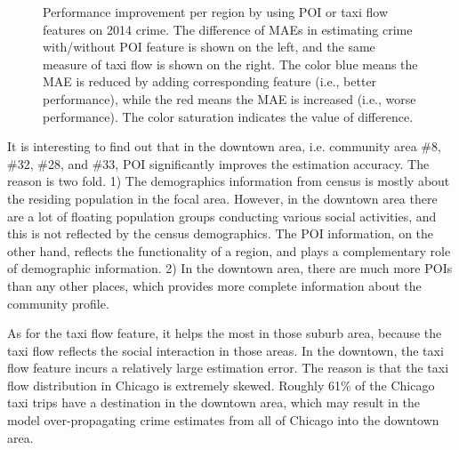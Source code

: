 \begin{figure}[h]
\centering
{}
\caption{Performance improvement per region by using POI or taxi flow features on 2014 crime. The difference of MAEs in estimating crime with/without POI feature is shown on the left, and the same measure of taxi flow is shown on the right. The color blue means the MAE is reduced by adding corresponding feature (i.e., better performance), while the red means the MAE is increased (i.e., worse performance). The color saturation indicates the value of difference.}
\label{fig:feat-area}
\end{figure}


It is interesting to find out that in the downtown area, i.e. community area \#8, \#32, \#28, and \#33, POI significantly improves the estimation accuracy. The reason is two fold. 1) The demographics information from census is mostly about the residing population in the focal area.  However, in the downtown area there are a lot of floating population groups conducting various social activities, and this is not reflected by the census demographics. The POI information, on the other hand, reflects the functionality of a region, and plays a complementary role of demographic information. 2) In the downtown area, there are much more POIs than any other places, which provides more complete information about the community profile.

As for the taxi flow feature, it helps the most in those suburb area, because the taxi flow reflects the social interaction in those areas. In the downtown, the taxi flow feature incurs a relatively large estimation error. The reason is that the taxi flow distribution in Chicago is extremely skewed. Roughly 61\% of the Chicago taxi trips have a destination in the downtown area, which may result in the model over-propagating crime estimates from all of Chicago into the downtown area.








